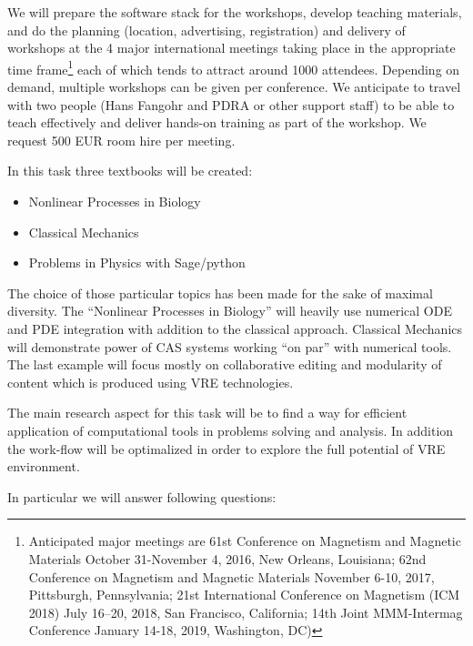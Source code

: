\begin{workpackage}[id=dissem,wphases=18-48!.5,
  title=Dissemination,
  SARM=1,
  USORM=7,
  USHRM=8,
  USRM=24
]
\begin{tasklist}
\begin{task}[title=OOMMF-NB dissemination workshops,
id=dissemination-of-oommf-nb-workshops]
  We will prepare the software stack for the workshops, develop teaching
  materials, and do the planning (location, advertising, registration)
  and delivery of workshops at the 4 major international meetings
  taking place in the appropriate time frame\footnote{Anticipated
    major meetings are 61st Conference
    on Magnetism and Magnetic Materials October 31-November 4, 2016,
    New Orleans, Louisiana; 62nd Conference on Magnetism and Magnetic
    Materials November 6-10, 2017, Pittsburgh, Pennsylvania; 21st
    International Conference on Magnetism (ICM 2018) July 16–20, 2018,
    San Francisco, California; 14th Joint MMM-Intermag Conference
    January 14-18, 2019, Washington, DC)} each of which tends to
  attract around 1000 attendees. Depending on demand, multiple
  workshops can be given per conference. We anticipate to travel with two
  people (Hans Fangohr and PDRA or other support staff) to be able to teach
  effectively and deliver hands-on training as part of the
  workshop. We request 500 EUR room hire per meeting.
\end{task}


\begin{task}[title=Demonstrator: interactive books,
id=ibook]
  In this task three textbooks will be created:

\begin{itemize}
\item Nonlinear Processes in Biology 
\item Classical Mechanics  
\item Problems  in Physics with Sage/python    
\end{itemize}

The choice of those particular topics has been made for the sake of  maximal diversity. The ``Nonlinear Processes in Biology'' will heavily use numerical ODE and PDE integration with addition to the classical approach. Classical Mechanics will demonstrate power of CAS systems working ``on par'' with numerical tools. The last example will focus mostly on collaborative editing and modularity of content which is produced using VRE technologies. 

The main research aspect for this task will be to find a way for efficient application of computational tools in problems solving and analysis. In addition the work-flow will be optimalized in order to explore the full potential of VRE environment. 

In particular we will answer following questions:


\end{task}
\end{tasklist}
\end{workpackage}
